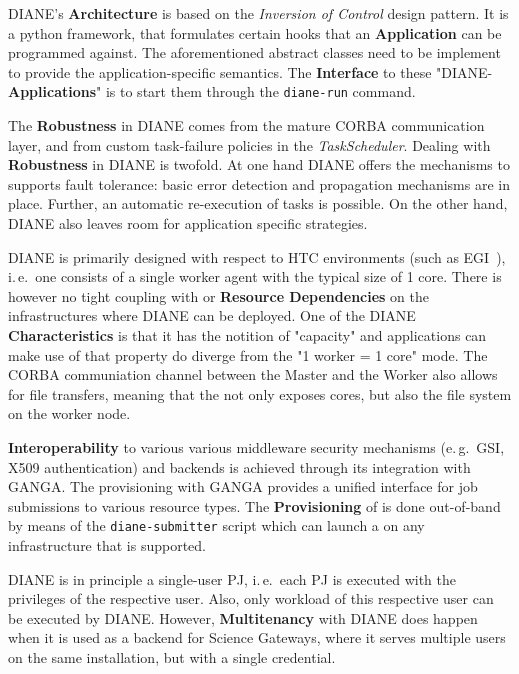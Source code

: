\documentclass{sig-alternate}
\begin{document}
DIANE's \textbf{Architecture} is based on the \textit{Inversion of Control}
design pattern.
It is a python framework, that formulates certain hooks that an
\textbf{Application} can be programmed against. The aforementioned abstract
classes need to be implement to provide the application-specific semantics.
The \textbf{Interface} to these "DIANE-\textbf{Applications}" is to start them
through the \texttt{diane-run} command.

The \textbf{Robustness} in DIANE comes from the mature CORBA communication
layer, and from custom task-failure policies in the \textit{TaskScheduler}.
Dealing with \textbf{Robustness} in DIANE is twofold.
At one hand DIANE offers the mechanisms to supports fault tolerance: basic
error detection and propagation mechanisms are in place.
Further, an automatic re-execution of tasks is possible.
On the other hand, DIANE also leaves room for application specific strategies.

DIANE is primarily designed with respect to HTC environments (such as
EGI~\cite{egi}), i.\,e.\ one \pilot consists of a single worker agent with the
typical size of 1 core.
There is however no tight coupling with or \textbf{Resource Dependencies} on
the infrastructures where DIANE can be deployed.
One of the DIANE \pilot \textbf{Characteristics} is that it has the notition of
"capacity" and applications can make use of that property do diverge from the
"1 worker = 1 core" mode.
The CORBA communiation channel between the Master and the Worker also allows
for file transfers, meaning that the \pilot not only exposes cores, but also
the file system on the worker node.

\textbf{Interoperability} to various various middleware security mechanisms
(e.\,g.\ GSI, X509 authentication) and backends is achieved through its
integration with GANGA.
The \pilot provisioning with GANGA provides a unified interface for job
submissions to various resource types.
The \textbf{Provisioning} of \pilots is done out-of-band by means of the
\texttt{diane-submitter} script which can launch a \pilot on any infrastructure
that is supported.




DIANE is in principle a single-user PJ, i.\,e.\ each PJ is executed with the
privileges of the respective user.
Also, only workload of this respective user can be executed by DIANE.
However, \textbf{Multitenancy} with DIANE does happen when it is used as a
backend for Science Gateways, where it serves multiple users on the same
installation, but with a single credential.
\end{document}
